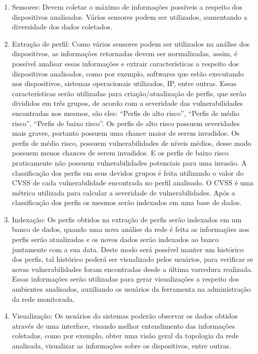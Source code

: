 \begin{enumerate}
\item Sensores: Devem coletar o máximo de informações possíveis a respeito dos dispositivos analisados. Vários sensores podem ser utilizados, aumentando a diversidade dos dados coletados.
\item Extração de perfil: Como vários sensores podem ser utilizados na análise dos dispositivos, as informações retornadas devem ser normalizadas, assim, é possível analisar essas informações e extrair características a respeito dos dispositivos analisados, como por exemplo, softwares que estão executando nos dispositivos, sistemas operacionais utilizados, \gls{IP}, entre outras. Essas características serão utilizadas para criação/atualização de perfis, que serão divididos em três grupos, de acordo com a severidade das  vulnerabilidades encontradas nos mesmos, são eles: ``Perfis de alto risco'', ``Perfis de médio risco'', ``Perfis de baixo risco''. Os perfis de alto risco possuem severidades mais graves, portanto possuem uma chance maior de serem invadidos. Os perfis de médio risco, possuem vulnerabilidades de níveis médios, desse modo possuem menos chances de serem invadidos. E os perfis de baixo risco praticamente não possuem vulnerabilidades potenciais para uma invasão. A classificação dos perfis em seus devidos grupos é feita utilizando o valor do \gls{CVSS} de cada vulnerabilidade encontrada no perfil analisado. O \gls{CVSS} é uma métrica utilizada para calcular a severidade de vulnerabilidades. Após a classificação dos perfis os mesmos serão indexados em uma base de dados.
\item Indexação: Os perfis obtidos na extração de perfis serão indexados em um banco de dados, quando uma nova análise da rede é feita as informações nos perfis serão atualizadas e os novos dados serão indexados ao banco juntamente com a sua data. Deste modo será possível manter um histórico dos perfis, tal histórico poderá ser visualizado pelos usuários, para verificar se novas vulnerabilidades foram encontradas desde a última varredura realizada. Essas informações serão utilizadas para gerar visualizações a respeito dos ambientes analisados, auxiliando os usuários da ferramenta na administração da rede monitorada.
\item Visualização: Os usuários do sistemas poderão observar os dados obtidos através de uma interface, visando melhor entendimento das informações coletadas, como por exemplo, obter uma visão geral da topologia da rede analisada, visualizar as informações sobre os dispositivos, entre outras.
\end{enumerate}


